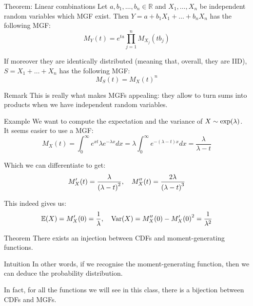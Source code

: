 \documentclass[a4paper]{article}
\begin{document}
\begin{parag}{Theorem: Linear combinations}
    Let $a, b_1, \ldots, b_n \in \mathbb{R}$ and $X_1, \ldots, X_n$ be independent random variables which MGF exist. Then $Y = a + b_1 X_1 + \ldots + b_n X_n$ has the following MGF: 
    \[M_Y\left(t\right) = e^{ta} \prod_{j=1}^{n} M_{X_j} \left(t b_j\right)\]

    If moreover they are identically distributed (meaning that, overall, they are IID), $S = X_1 + \ldots + X_n$ has the following MGF: 
    \[M_S\left(t\right) = M_X\left(t\right)^n\]
    
    \begin{subparag}{Remark}
        This is really what makes MGFs appealing: they allow to turn sums into products when we have independent random variables.
    \end{subparag}
\end{parag}

\begin{parag}{Example}
    We want to compute the expectation and the variance of $X \followsdistr \exp\left(\lambda\right)$. It seems easier to use a MGF: 
    \[M_X\left(t\right) = \int_{0}^{\infty} e^{xt} \lambda e^{-\lambda x} dx = \lambda \int_{0}^{\infty} e^{-\left(\lambda - t\right)x} dx = \frac{\lambda}{\lambda - t}\]
    
    Which we can differentiate to get: 
    \[M'_X\left(t\right) = \frac{\lambda}{\left(\lambda - t\right)^2}, \mathspace M''_X\left(t\right) = \frac{2 \lambda}{\left(\lambda - t\right)^3}\]
    
    This indeed gives us: 
    \[\exval\left(X\right) = M'_X\left(0\right) = \frac{1}{\lambda}, \mathspace \Var\left(X\right) = M''_X\left(0\right) - M'_X\left(0\right)^2 = \frac{1}{\lambda ^2}\]
\end{parag}

\begin{parag}{Theorem}
    There exists an injection between CDFs and moment-generating functions. 

    \begin{subparag}{Intuition}
        In other words, if we recognise the moment-generating function, then we can deduce the probability distribution.

        In fact, for all the functions we will see in this class, there is a bijection between CDFs and MGFs.
    \end{subparag}
\end{parag}
\end{document}
